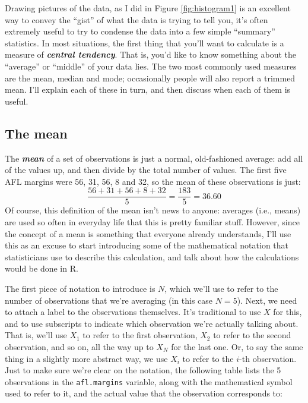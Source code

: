 \documentclass[
]{book}
\begin{document}
Drawing pictures of the data, as I did in Figure \ref{fig:histogram1} is an excellent way to convey the ``gist'' of what the data is trying to tell you, it's often extremely useful to try to condense the data into a few simple ``summary'' statistics. In most situations, the first thing that you'll want to calculate is a measure of \textbf{\emph{central tendency}}. That is, you'd like to know something about the ``average'' or ``middle'' of your data lies. The two most commonly used measures are the mean, median and mode; occasionally people will also report a trimmed mean. I'll explain each of these in turn, and then discuss when each of them is useful.

\hypertarget{mean}{%
\subsection{The mean}\label{mean}}

The \textbf{\emph{mean}} of a set of observations is just a normal, old-fashioned average: add all of the values up, and then divide by the total number of values. The first five AFL margins were 56, 31, 56, 8 and 32, so the mean of these observations is just:
\[
\frac{56 + 31 + 56 + 8 + 32}{5} = \frac{183}{5} = 36.60
\]
Of course, this definition of the mean isn't news to anyone: averages (i.e., means) are used so often in everyday life that this is pretty familiar stuff. However, since the concept of a mean is something that everyone already understands, I'll use this as an excuse to start introducing some of the mathematical notation that statisticians use to describe this calculation, and talk about how the calculations would be done in R.

The first piece of notation to introduce is \(N\), which we'll use to refer to the number of observations that we're averaging (in this case \(N = 5\)). Next, we need to attach a label to the observations themselves. It's traditional to use \(X\) for this, and to use subscripts to indicate which observation we're actually talking about. That is, we'll use \(X_1\) to refer to the first observation, \(X_2\) to refer to the second observation, and so on, all the way up to \(X_N\) for the last one. Or, to say the same thing in a slightly more abstract way, we use \(X_i\) to refer to the \(i\)-th observation. Just to make sure we're clear on the notation, the following table lists the 5 observations in the \texttt{afl.margins} variable, along with the mathematical symbol used to refer to it, and the actual value that the observation corresponds to:
\end{document}
